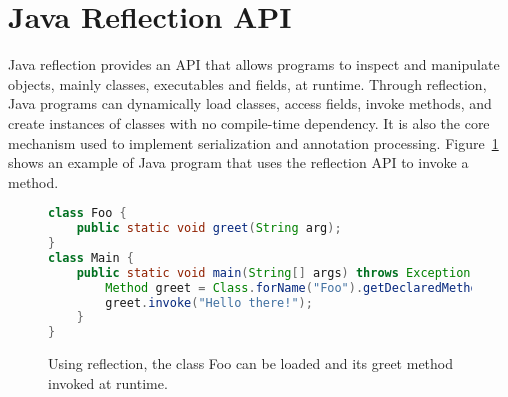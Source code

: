 



\section{Java Reflection API}
Java reflection provides an API that allows programs to inspect and manipulate objects, mainly classes,  executables and fields, at runtime.
Through reflection, Java programs can dynamically load classes, access fields, invoke methods, and create instances of classes with no compile-time dependency. It is also the core mechanism used to implement serialization and annotation processing. Figure~\ref{fig:reflective_calls} shows an example of Java program that uses the reflection API to invoke a method.

\begin{figure}[ht]
    \centering
\begin{lstlisting}[language=Java]
class Foo {
    public static void greet(String arg);
}
class Main {
    public static void main(String[] args) throws Exception {
        Method greet = Class.forName("Foo").getDeclaredMethod("greet");
        greet.invoke("Hello there!");
    }  
}
\end{lstlisting}
    \caption{Using reflection, the class Foo can be loaded and its greet method invoked at runtime.}
    \label{fig:reflective_calls}
\end{figure}

